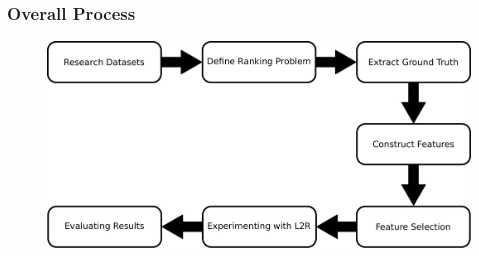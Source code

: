 
\begin{frame}
  \frametitle{Overall Process}
  
  
  \begin{figure}[tbph]
    \centering
    \includegraphics[width=\linewidth]{images/overall_process}
  \end{figure}
  
\end{frame}